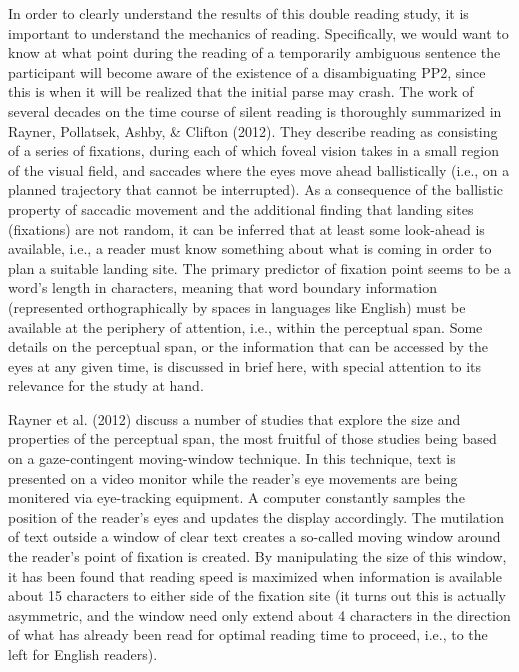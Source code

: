 \documentclass[11pt,oneside]{book}
\begin{document}
In order to clearly understand the results of this double reading study, it is important to understand the mechanics of reading. Specifically, we would want to know at what point during the reading of a temporarily ambiguous sentence the participant will become aware of the existence of a disambiguating PP2, since this is when it will be realized that the initial parse may crash. The work of several decades on the time course of silent reading is thoroughly summarized in Rayner, Pollatsek, Ashby, \& Clifton (2012). They describe reading as consisting of a series of fixations, during each of which foveal vision takes in a small region of the visual field, and saccades where the eyes move ahead ballistically (i.e., on a planned trajectory that cannot be interrupted). As a consequence of the ballistic property of saccadic movement and the additional finding that landing sites (fixations) are not random, it can be inferred that at least some look-ahead is available, i.e., a reader must know something about what is coming in order to plan a suitable landing site. The primary predictor of fixation point seems to be a word's length in characters, meaning that word boundary information (represented orthographically by spaces in languages like English) must be available at the periphery of attention, i.e., within the perceptual span. Some details on the perceptual span, or the information that can be accessed by the eyes at any given time, is discussed in brief here, with special attention to its relevance for the study at hand.

Rayner et al. (2012) discuss a number of studies that explore the size and properties of the perceptual span, the most fruitful of those studies being based on a gaze-contingent moving-window technique. In this technique, text is presented on a video monitor while the reader's eye movements are being monitered via eye-tracking equipment. A computer constantly samples the position of the reader's eyes and updates the display accordingly. The mutilation of text outside a window of clear text creates a so-called moving window around the reader's point of fixation is created. By manipulating the size of this window, it has been found that reading speed is maximized when information is available about 15 characters to either side of the fixation site (it turns out this is actually asymmetric, and the window need only extend about 4 characters in the direction of what has already been read for optimal reading time to proceed, i.e., to the left for English readers).
\end{document}
